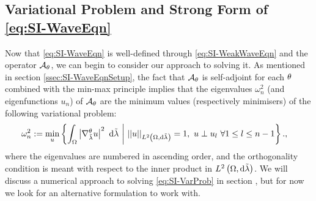 \subsection{Variational Problem and Strong Form of \eqref{eq:SI-WaveEqn}} \label{ssec:SI-Derivation}
Now that \eqref{eq:SI-WaveEqn} is well-defined through \eqref{eq:SI-WeakWaveEqn} and the operator $\mathcal{A}_{\theta}$, we can begin to consider our approach to solving it.
As mentioned in section \ref{ssec:SI-WaveEqnSetup}, the fact that $\mathcal{A}_{\theta}$ is self-adjoint for each $\theta$ combined with the min-max principle implies that the eigenvalues $\omega_{n}^2$ (and eigenfunctions $u_n$) of $\mathcal{A}_{\theta}$ are the minimum values (respectively minimisers) of the following variational problem:
\begin{align} \label{eq:SI-VarProb}
	\omega_n^2 &:= \min_{u}\left\{  \int_{\Omega} \left\lvert \nabla^{\theta}_{\tilde{\lambda}}u \right\rvert^2  \ \mathrm{d}\tilde{\lambda} \ \middle\vert \  \lvert\lvert u \rvert\rvert_{L^{2}\left( \Omega,\mathrm{d}\tilde{\lambda} \right)}=1, \ u\perp u_l \ \forall 1\leq l\leq n-1  \right\}.,
\end{align} 
where the eigenvalues are numbered in ascending order, and the orthogonality condition is meant with respect to the inner product in $L^{2}\left( \Omega,\mathrm{d}\tilde{\lambda} \right)$.
We will discuss a numerical approach to solving \eqref{eq:SI-VarProb} in section , but for now we look for an alternative formulation to work with.

